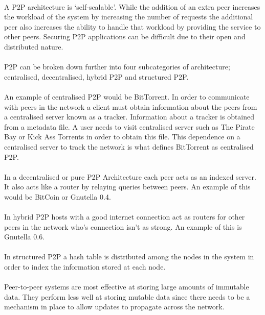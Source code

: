 \documentclass[11pt]{amsart}
\begin{document}
\paragraph{}
A P2P architecture is `self-scalable'. While the addition of an extra peer increases the workload of the system by increasing the number of requests the additional peer also increases the ability to handle that workload by providing the service to other peers. Securing P2P applications can be difficult due to their open and distributed nature.
\paragraph{}
P2P can be broken down further into four subcategories of architecture; centralised, decentralised, hybrid P2P and structured P2P.
\paragraph{}
An example of centralised P2P would be BitTorrent. In order to communicate with peers in the network a client must obtain information about the peers from a centralised server known as a tracker. Information about a tracker is obtained from a metadata file. A user needs to visit centralised server such as The Pirate Bay or Kick Ass Torrents in order to obtain this file. This dependence on a centralised server to track the network is what defines BitTorrent as centralised P2P.
\paragraph{}
In a decentralised or pure P2P Architecture each peer acts as an indexed server. It also acts like a router by relaying queries between peers. An example of this would be BitCoin or Gnutella 0.4.
\paragraph{}
In hybrid P2P hosts with a good internet connection act as routers for other peers in the network who's connection isn't as strong. An example of this is Gnutella 0.6.
\paragraph{}
In structured P2P a hash table is distributed among the nodes in the system in order to index the information stored at each node. 
\paragraph{}
Peer-to-peer systems are most effective at storing large amounts of immutable data. They perform less well at storing mutable data since there needs to be a mechanism in place to allow updates to propagate across the network.
\end{document}
